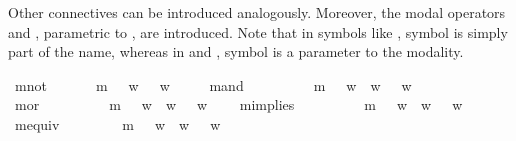 \begin{isabellebody}
\begin{isamarkuptext}
Other connectives can be introduced analogously. Moreover, the modal 
operators \isa{{\isasymbox}} and \isa{{\isasymdiamond}}, parametric to ,  are introduced.
Note that in symbols like , symbol  is simply part of the name,
whereas in  and , symbol  is a parameter to the modality.%
\end{isamarkuptext}%
\isamarkuptrue%
\isamarkupfalse%
\ mnot\ {\isacharcolon}{\isacharcolon}\ {\isachardoublequoteopen}{\isasymsigma}\ {\isasymRightarrow}\ {\isasymsigma}{\isachardoublequoteclose}\ \ \ {\isachardoublequoteopen}{\isasymnot}\isactrlsup m\ {\isasymphi}\ {\isasymequiv}\ {\isacharparenleft}{\isasymlambda}w{\isachardot}\ {\isasymnot}\ {\isasymphi}\ w{\isacharparenright}{\isachardoublequoteclose}\ \ \ \ \isanewline
{}\isamarkupfalse%
\ mand\ {\isacharcolon}{\isacharcolon}\ {\isachardoublequoteopen}{\isasymsigma}\ {\isasymRightarrow}\ {\isasymsigma}\ {\isasymRightarrow}\ {\isasymsigma}{\isachardoublequoteclose}\ \ \ {\isachardoublequoteopen}{\isasymphi}\ {\isasymand}\isactrlsup m\ {\isasympsi}\ {\isasymequiv}\ {\isacharparenleft}{\isasymlambda}w{\isachardot}\ {\isasymphi}\ w\ {\isasymand}\ {\isasympsi}\ w{\isacharparenright}{\isachardoublequoteclose}\ \ \ \isanewline
{}\isamarkupfalse%
\ mor\ {\isacharcolon}{\isacharcolon}\ {\isachardoublequoteopen}{\isasymsigma}\ {\isasymRightarrow}\ {\isasymsigma}\ {\isasymRightarrow}\ {\isasymsigma}{\isachardoublequoteclose}\ \ \ {\isachardoublequoteopen}{\isasymphi}\ {\isasymor}\isactrlsup m\ {\isasympsi}\ {\isasymequiv}\ {\isacharparenleft}{\isasymlambda}w{\isachardot}\ {\isasymphi}\ w\ {\isasymor}\ {\isasympsi}\ w{\isacharparenright}{\isachardoublequoteclose}\ \ \ \isanewline
{}\isamarkupfalse%
\ mimplies\ {\isacharcolon}{\isacharcolon}\ {\isachardoublequoteopen}{\isasymsigma}\ {\isasymRightarrow}\ {\isasymsigma}\ {\isasymRightarrow}\ {\isasymsigma}{\isachardoublequoteclose}\ \ \ {\isachardoublequoteopen}{\isasymphi}\ {\isasymrightarrow}\isactrlsup m\ {\isasympsi}\ {\isasymequiv}\ {\isacharparenleft}{\isasymlambda}w{\isachardot}\ {\isasymphi}\ w\ {\isasymlongrightarrow}\ {\isasympsi}\ w{\isacharparenright}{\isachardoublequoteclose}\ \ \isanewline
{}\isamarkupfalse%
\ mequiv{\isacharcolon}{\isacharcolon}\ {\isachardoublequoteopen}{\isasymsigma}\ {\isasymRightarrow}\ {\isasymsigma}\ {\isasymRightarrow}\ {\isasymsigma}{\isachardoublequoteclose}\ \ \ {\isachardoublequoteopen}{\isasymphi}\ {\isasymequiv}\isactrlsup m\ {\isasympsi}\ {\isasymequiv}\ {\isacharparenleft}{\isasymlambda}w{\isachardot}\ {\isasymphi}\ w\ {\isasymlongleftrightarrow}\ {\isasympsi}\ w{\isacharparenright}{\isachardoublequoteclose}\ \ \isanewline

\end{isabellebody}
